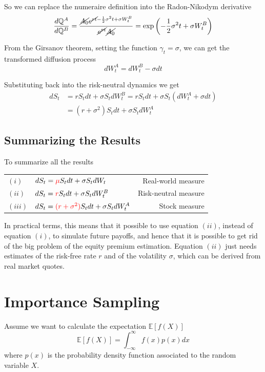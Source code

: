 \documentclass[12pt,a4paper]{article}
\begin{document}
So we can replace the numeraire definition into the Radon-Nikodym derivative
\begin{equation*}
\frac{d\mathbb{Q}^A}{d\mathbb{Q}^B}=\frac{\cancel{A_0}e^{\cancel{rt}-\frac{1}{2}\sigma^2 t + \sigma W^B_t}}{\cancel{e^{rt}}\cancel{A_0}}=\exp\left(-\frac{1}{2}\sigma^2 t + \sigma W^B_t\right)
\end{equation*}

From the Girsanov theorem, setting the function $\gamma_t = \sigma$, we can get the transformed diffusion process
\begin{equation*}
dW_t^A = dW_t^B - \sigma dt 
\end{equation*}

Substituting back into the risk-neutral dynamics we get
\begin{equation*}
\begin{aligned}
dS_t &= r S_t dt + \sigma S_t dW_t^B = 
rS_t dt + \sigma S_t (dW_t^A + \sigma dt) \\
& = (r + \sigma^2)S_t dt + \sigma S_t dW^A_t
\end{aligned}
\end{equation*}

\subsection{Summarizing the Results}
To summarize all the results

\begin{table}[htbp]
\begin{center}
\begin{tabular}{llr}
$(i)$&$dS_t = \textcolor{red}{\mu} S_t dt + \sigma S_t dW_t$ & Real-world measure \\
$(ii)$&$dS_t = \textcolor{red}{r}S_t dt + \sigma S_t dW_t^B$ & Risk-neutral measure \\
$(iii)$&$dS_t = \textcolor{red}{(r + \sigma^2)}S_t dt + \sigma S_t dW^A_t$ & Stock measure
\end{tabular}
\end{center}
\end{table}
In practical terms, this means that it possible to use equation $(ii)$, instead of equation $(i)$, to simulate future payoffs, and hence that it is possible to get rid of the big problem of the equity premium estimation. Equation $(ii)$ just needs estimates of the risk-free rate $r$ and of the volatility $\sigma$, which can be derived from real market quotes.

\clearpage
\section{Importance Sampling}
Assume we want to calculate the expectation $\mathbb{E}[f(X)]$
\begin{equation}
\mathbb{E}[f(X)] = \int_{-\infty}^\infty f(x)p(x)dx
\end{equation}
where $p(x)$ is the probability density function associated to the random variable $X$.
\end{document}
